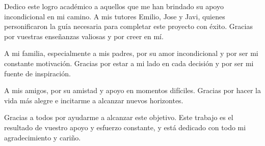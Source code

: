 \documentclass[11pt,a4paper,titlepage,oneside]{report}
\begin{document}


\paxinaenbranco
\begin{agradecementos}
 Dedico este logro académico a aquellos que me han brindado su apoyo incondicional en mi camino. A mis tutores Emilio, Jose y Javi, quienes personificaron la guía necesaria para completar este proyecto con éxito. Gracias por vuestras enseñanzas valiosas y por creer en mí.

A mi familia, especialmente a mis padres, por su amor incondicional y por ser mi constante motivación. Gracias por estar a mi lado en cada decisión y por ser mi fuente de inspiración.

A mis amigos, por su amistad y apoyo en momentos difíciles. Gracias por hacer la vida más alegre e incitarme a alcanzar nuevos horizontes.

Gracias a todos por ayudarme a alcanzar este objetivo. Este trabajo es el resultado de vuestro apoyo y esfuerzo constante, y está dedicado con todo mi agradecimiento y cariño.
 \end{agradecementos}


\setcounter{page}{1}

\tableofcontents
\listoffigures
\listoftables
\clearpage

\setcounter{page}{1}











\appendix
\appendixpage

%

\printglossary[type=\acronymtype,title=\nomeglosarioacronimos]
\printglossary[title=\nomeglosariotermos]



\clearpage
\end{document}
